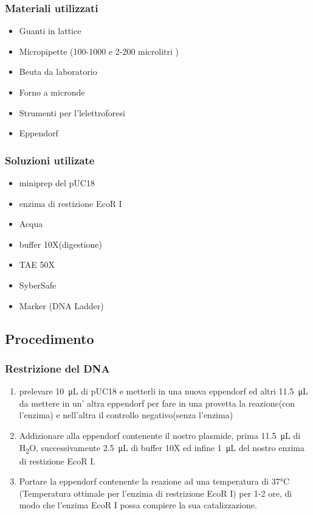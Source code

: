 \subsubsection{Materiali utilizzati}

\begin{itemize}
	\item Guanti in lattice 
	\item Micropipette (100-1000  e 2-200 microlitri  )
	\item Beuta da laboratorio
	\item Forno a micronde
	\item Strumenti per l'lelettroforesi
	\item Eppendorf
\end{itemize}


\subsubsection{Soluzioni utilizate}

\begin{itemize}

	\item miniprep del pUC18
	\item enzima di restizione EcoR I
	\item Acqua
	\item buffer 10X(digestione)
	\item TAE 50X
	\item SyberSafe
	\item Marker (DNA Ladder)

\end{itemize}

\subsection{Procedimento}

\subsubsection{Restrizione del DNA}

\begin{enumerate}

	\item prelevare  \SI{10}{\micro\liter} di pUC18 e metterli in una nuova eppendorf ed altri  \SI{11.5}{\micro\liter} da mettere in un' altra eppendorf per fare in una provetta la reazione(con l'enzima) e nell'altra il controllo negativo(senza l'enzima) 
	
	\item Addizionare alla eppendorf contenente il nostro plasmide, prima \SI{11.5}{\micro\liter} di H\textsubscript{2}O, successivamente  \SI{2.5}{\micro\liter} di buffer 10X ed infine  \SI{1}{\micro\liter} del nostro enzima di restizione EcoR I.
	
	\item Portare la eppendorf contenente la reazione ad una temperatura di 37°C (Temperatura ottimale per l'enzima di restrizione EcoR I) per 1-2 ore, di modo che l'enzima EcoR I possa compiere la sua catalizzazione.

\end{enumerate}

